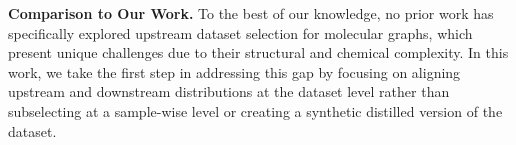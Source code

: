 \textbf{Comparison to Our Work.} To the best of our knowledge, no prior work has specifically explored upstream dataset selection for molecular graphs, which present unique challenges due to their structural and chemical complexity. In this work, we take the first step in addressing this gap by focusing on aligning upstream and downstream distributions at the dataset level rather than subselecting at a sample-wise level or creating a synthetic distilled version of the dataset.

